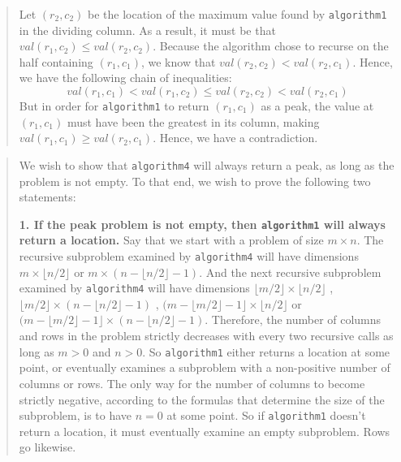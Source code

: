 \documentclass[12pt,twoside]{article}
\begin{document}
\begin{problems}
\begin{quote}
Let $(r_2, c_2)$ be
the location of the maximum value found by \texttt{algorithm1}
in the dividing column.
As a result, it must be that $val(r_1, c_2) \le val(r_2, c_2)$.
Because the algorithm chose to recurse
on the half containing $(r_1, c_1)$,
we know that $val(r_2, c_2) < val(r_2, c_1)$.
Hence, we have the following chain of inequalities:
$$val(r_1, c_1) < val(r_1, c_2) \le val(r_2, c_2) < val(r_2, c_1)$$
But in order for \texttt{algorithm1} to return $(r_1, c_1)$ as a peak,
the value at $(r_1, c_1)$ must have been the greatest in its column,
making $val(r_1, c_1) \ge val(r_2, c_1)$.
Hence, we have a contradiction.
\end{quote}

\ifsolution \solution{}
\begin{quote}
    We wish to show that \texttt{algorithm4}
    will always return a peak,
    as long as the problem is not empty.
    To that end,
    we wish to prove the following two statements:
    
    {\bf 1. If the peak problem is not empty,
    then \texttt{algorithm1} will always return a location.}
    Say that we start with a problem of size $m \times n$.
    The recursive subproblem examined by \texttt{algorithm4}
    will have dimensions
    $m \times \lfloor n / 2 \rfloor$ or 
    $m \times \left(n - \lfloor n / 2 \rfloor - 1 \right)$.
    And the next recursive subproblem examined by \texttt{algorithm4}
    will have dimensions
    $\lfloor m / 2 \rfloor \times \lfloor n / 2 \rfloor$ , 
    $\lfloor m / 2 \rfloor 
    \times \left(n - \lfloor n / 2 \rfloor - 1 \right)$ ,
    $(m - \lfloor m / 2 \rfloor - 1 \rfloor 
    \times \lfloor n / 2 \rfloor$ or 
    $(m - \lfloor m / 2 \rfloor - 1 \rfloor \times 
    \left(n - \lfloor n / 2 \rfloor - 1 \right)$.
    Therefore, the number of columns and rows in the problem
    strictly decreases with every two recursive calls
    as long as $m > 0$ and $n > 0$.
    So \texttt{algorithm1} either returns a location at some point,
    or eventually examines a subproblem with a non-positive
    number of columns or rows.
    The only way for the number of columns to become strictly negative,
    according to the formulas that determine the size of the subproblem,
    is to have $n = 0$ at some point.
    So if \texttt{algorithm1} doesn't return a location,
    it must eventually examine an empty subproblem.
    Rows go likewise.
    

\end{quote}
\end{problems}
\end{document}
